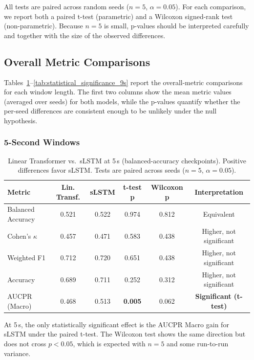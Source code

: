 All tests are paired across random seeds ($n=5$, $\alpha=0.05$). For each comparison, we report both a paired t-test (parametric) and a Wilcoxon signed-rank test (non-parametric). Because $n=5$ is small, p-values should be interpreted carefully and together with the size of the observed differences.

\subsection{Overall Metric Comparisons}
\label{app:overall_metric_tests}

Tables~\ref{tab:statistical_significance_5s}--\ref{tab:statistical_significance_9s} report the overall-metric comparisons for each window length. The first two columns show the mean metric values (averaged over seeds) for both models, while the p-values quantify whether the per-seed differences are consistent enough to be unlikely under the null hypothesis.

\subsubsection{5-Second Windows}

\begin{table}[htbp]
\centering
\caption{Linear Transformer vs.\ \ac{sLSTM} at 5\,s (balanced-accuracy checkpoints). Positive differences favor \ac{sLSTM}. Tests are paired across seeds ($n=5$, $\alpha=0.05$).}
\label{tab:statistical_significance_5s}
\footnotesize
\begin{tabular}{l | c | c | c | c | c}
			\textbf{Metric} & \textbf{Lin. Transf.} & \textbf{\ac{sLSTM}} & \textbf{t-test p} & \textbf{Wilcoxon p} & \textbf{Interpretation} \\
\hline
Balanced Accuracy  & 0.521 & 0.522 & 0.974 & 0.812 & Equivalent \\
Cohen's $\kappa$    & 0.457 & 0.471 & 0.583 & 0.438 & Higher, not significant \\
Weighted F1         & 0.712 & 0.720 & 0.651 & 0.438 & Higher, not significant \\
Accuracy            & 0.689 & 0.711 & 0.252 & 0.312 & Higher, not significant \\
AUCPR (Macro)       & 0.468 & 0.513 & \textbf{0.005} & 0.062 & \textbf{Significant (t-test)} \\
\hline
\end{tabular}
\end{table}

At 5\,s, the only statistically significant effect is the AUCPR Macro gain for \ac{sLSTM} under the paired t-test. The Wilcoxon test shows the same direction but does not cross $p<0.05$, which is expected with $n=5$ and some run-to-run variance.


